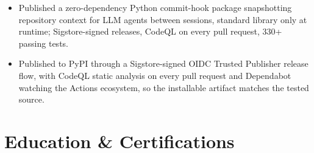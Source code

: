 \documentclass[letterpaper,10pt]{article}
\begin{document}
\begin{itemize}
\item Published a zero-dependency Python commit-hook package snapshotting repository context for LLM agents between sessions, standard library only at runtime; Sigstore-signed releases, CodeQL on every pull request, 330+ passing tests.
\item Published to PyPI through a Sigstore-signed OIDC Trusted Publisher release flow, with CodeQL static analysis on every pull request and Dependabot watching the Actions ecosystem, so the installable artifact matches the tested source.
\end{itemize}

\section{Education \& Certifications}
\end{document}
